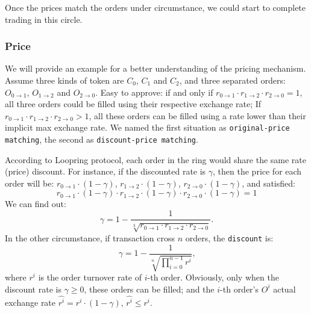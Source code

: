 \documentclass[UTF8,nofonts]{article}
\begin{document}
Once the prices match the orders under circumstance, we could start to complete trading in this circle.

\subsubsection{Price\label{sec: matchprice}}
We will provide an example for a better understanding of the pricing mechanism. Assume three kinds of token are $C_{0}$, $C_{1}$ and $C_{2}$, and three separated orders: $O_{0\rightarrow 1}$, $O_{1 \rightarrow 2}$ and $O_{2 \rightarrow 0}$. Easy to approve: if and only if $r_{0 \rightarrow 1} \cdot r_{1 \rightarrow 2}\cdot r_{2 \rightarrow 0} = 1$,  all three orders could be filled using their respective exchange rate; If $r_{0 \rightarrow 1} \cdot r_{1 \rightarrow 2}\cdot r_{2 \rightarrow 0} > 1$, all these orders can be filled using a rate lower than their implicit max exchange rate. We named the first situation as \texttt{original-price matching}, the second as \texttt{discount-price matching}.

According to Loopring protocol, each order in the ring would share the same rate (price) discount. For instance, if the discounted rate is $\gamma$, then the price for each order will be:
$r_{0\rightarrow 1} \cdot (1-\gamma)$, $r_{1\rightarrow 2} \cdot (1-\gamma)$, $r_{2 \rightarrow 0} \cdot (1-\gamma)$, and satisfied: 
\begin{equation}
r_{0\rightarrow 1} \cdot (1-\gamma)\cdot r_{1\rightarrow 2} \cdot (1-\gamma) \cdot r_{2 \rightarrow 0} \cdot (1-\gamma) = 1
\end{equation}
We can find out: 
\begin{equation*}
\gamma = 1- \frac{1}{\sqrt[3]{r_{0\rightarrow 1} \cdot r_{1\rightarrow 2} \cdot r_{2\rightarrow 0}}}\text{.}
\end{equation*}
In the other circumstance, if transaction cross $n$ orders, the \texttt{discount} is: 
\begin{equation*}
\gamma = 1- \frac{1}{\sqrt[n]{\prod_{i=0}^{n-1} r^i}} \text{,}
\end{equation*}
where $r^i$ is the order turnover rate of $i$-th order. Obviously, only when the discount rate is $\gamma \ge 0$, these orders can be filled; and the $i$-th order's $O^i$ actual exchange rate $\hat{r^i} = r^i \cdot (1-\gamma)$, $\hat{r^i}\le r^i$.

\end{document}
